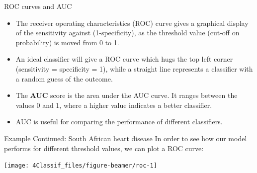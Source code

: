 \documentclass[
  10pt,
  ignorenonframetext,
]{beamer}
\providecommand{\tightlist}{%
  \setlength{\itemsep}{0pt}\setlength{\parskip}{0pt}}
\begin{document}
\begin{frame}
\begin{block}{ROC curves and AUC}
\protect\hypertarget{roc-curves-and-auc}{}
\(~\)

\begin{itemize}
\tightlist
\item
  The receiver operating characteristics (ROC) curve gives a graphical
  display of the sensitivity against (1-specificity), as the threshold
  value (cut-off on probability) is moved from 0 to 1.
\end{itemize}

\vspace{2mm}

\begin{itemize}
\tightlist
\item
  An ideal classifier will give a ROC curve which hugs the top left
  corner (sensitivity = specificity = 1), while a straight line
  represents a classifier with a random guess of the outcome.
\end{itemize}

\vspace{2mm}

\begin{itemize}
\tightlist
\item
  The \textbf{AUC} score is the area under the AUC curve. It ranges
  between the values 0 and 1, where a higher value indicates a better
  classifier.
\end{itemize}

\vspace{2mm}

\begin{itemize}
\tightlist
\item
  AUC is useful for comparing the performance of different classifiers.
\end{itemize}
\end{block}
\end{frame}

\begin{frame}
\begin{block}{Example Continued: South African heart disease}
\protect\hypertarget{example-continued-south-african-heart-disease-1}{}
In order to see how our model performs for different threshold values,
we can plot a ROC curve:

\vspace{2mm}

\scriptsize

\begin{center}\texttt{[image: 4Classif\_files/figure-beamer/roc-1]} \end{center}
\end{block}
\end{frame}
\end{document}
